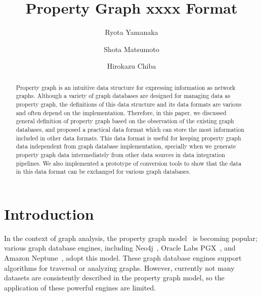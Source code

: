 \documentclass[runningheads]{llncs}
\begin{document}
\newtheorem{defi}[theorem]{Definition}
%
\title{Property Graph xxxx Format}
%
%
\author{Ryota Yamanaka \and Shota Matsumoto \and Hirokazu Chiba}
%
%
%
\maketitle              %
%
\begin{abstract}
Property graph is an intuitive data structure for expressing information as network graphs. Although a variety of graph databases are designed for managing data as property graph, the definitions of this data structure and its data formats are various and often depend on the implementation. Therefore, in this paper, we discussed general definition of property graph based on the observation of the existing graph databases, and proposed a practical data format which can store the most information included in other data formats. This data format is useful for keeping property graph data independent from graph database implementation, specially when we generate property graph data intermediately from other data sources in data integration pipelines. We also implemented a prototype of conversion tools to show that the data in this data format can be exchanged for various graph databases.

\end{abstract}

\section{Introduction}

In the context of graph analysis, the property graph model~\cite{angles} is becoming popular; various graph database engines, including Neo4j~\cite{neo4j}, Oracle Labs PGX~\cite{pgx}, and Amazon Neptune~\cite{neptune}, adopt this model. These graph database engines support algorithms for traversal or analyzing graphs. However, currently not many datasets are consistently described in the property graph model, so the application of these powerful engines are limited.
\end{document}

